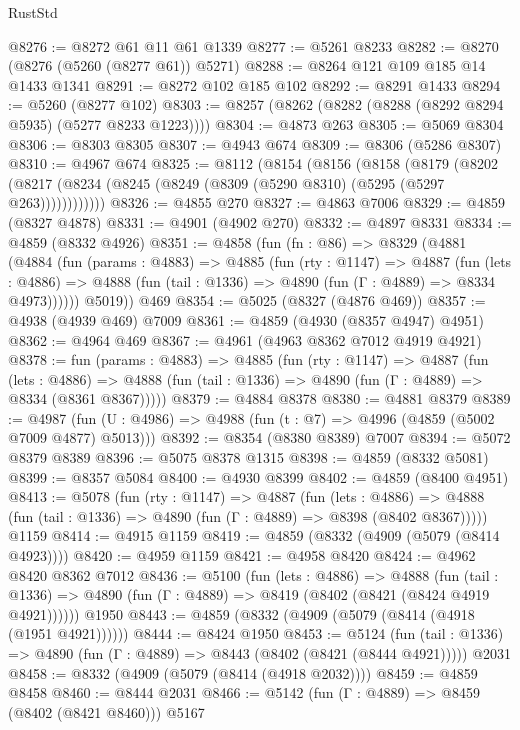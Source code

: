 \begin{lexlean}{RustStd}
\begin{coremodule}
@8276 := @8272 @61 @11 @61 @1339
@8277 := @5261 @8233
@8282 := @8270 (@8276 (@5260 (@8277 @61)) @5271)
@8288 := @8264 @121 @109 @185 @14 @1433 @1341
@8291 := @8272 @102 @185 @102
@8292 := @8291 @1433
@8294 := @5260 (@8277 @102)
@8303 := @8257 (@8262 (@8282 (@8288 (@8292 @8294 @5935) (@5277 @8233 @1223))))
@8304 := @4873 @263
@8305 := @5069 @8304
@8306 := @8303 @8305
@8307 := @4943 @674
@8309 := @8306 (@5286 @8307)
@8310 := @4967 @674
@8325 := @8112
    (@8154
      (@8156
        (@8158
          (@8179
            (@8202 (@8217 (@8234 (@8245 (@8249 (@8309 (@5290 @8310) (@5295 (@5297 @263))))))))))))
@8326 := @4855 @270
@8327 := @4863 @7006
@8329 := @4859 (@8327 @4878)
@8331 := @4901 (@4902 @270)
@8332 := @4897 @8331
@8334 := @4859 (@8332 @4926)
@8351 := @4858
    (fun (fn : @86) =>
    @8329
      (@4881
        (@4884
          (fun (params : @4883) =>
          @4885
            (fun (rty : @1147) =>
            @4887
              (fun (lets : @4886) =>
              @4888 (fun (tail : @1336) => @4890 (fun (Γ : @4889) => @8334 @4973))))))
        @5019))
    @469
@8354 := @5025 (@8327 (@4876 @469))
@8357 := @4938 (@4939 @469) @7009
@8361 := @4859 (@4930 (@8357 @4947) @4951)
@8362 := @4964 @469
@8367 := @4961 (@4963 @8362 @7012 @4919 @4921)
@8378 := fun (params : @4883) =>
  @4885
    (fun (rty : @1147) =>
    @4887
      (fun (lets : @4886) =>
      @4888 (fun (tail : @1336) => @4890 (fun (Γ : @4889) => @8334 (@8361 @8367)))))
@8379 := @4884 @8378
@8380 := @4881 @8379
@8389 := @4987 (fun (U : @4986) => @4988 (fun (t : @7) => @4996 (@4859 (@5002 @7009 @4877) @5013)))
@8392 := @8354 (@8380 @8389) @7007
@8394 := @5072 @8379 @8389
@8396 := @5075 @8378 @1315
@8398 := @4859 (@8332 @5081)
@8399 := @8357 @5084
@8400 := @4930 @8399
@8402 := @4859 (@8400 @4951)
@8413 := @5078
    (fun (rty : @1147) =>
    @4887
      (fun (lets : @4886) =>
      @4888 (fun (tail : @1336) => @4890 (fun (Γ : @4889) => @8398 (@8402 @8367)))))
    @1159
@8414 := @4915 @1159
@8419 := @4859 (@8332 (@4909 (@5079 (@8414 @4923))))
@8420 := @4959 @1159
@8421 := @4958 @8420
@8424 := @4962 @8420 @8362 @7012
@8436 := @5100
    (fun (lets : @4886) =>
    @4888
      (fun (tail : @1336) => @4890 (fun (Γ : @4889) => @8419 (@8402 (@8421 (@8424 @4919 @4921))))))
    @1950
@8443 := @4859 (@8332 (@4909 (@5079 (@8414 (@4918 (@1951 @4921))))))
@8444 := @8424 @1950
@8453 := @5124
    (fun (tail : @1336) => @4890 (fun (Γ : @4889) => @8443 (@8402 (@8421 (@8444 @4921)))))
    @2031
@8458 := @8332 (@4909 (@5079 (@8414 (@4918 @2032))))
@8459 := @4859 @8458
@8460 := @8444 @2031
@8466 := @5142 (fun (Γ : @4889) => @8459 (@8402 (@8421 @8460))) @5167

\end{coremodule}
\end{lexlean}
